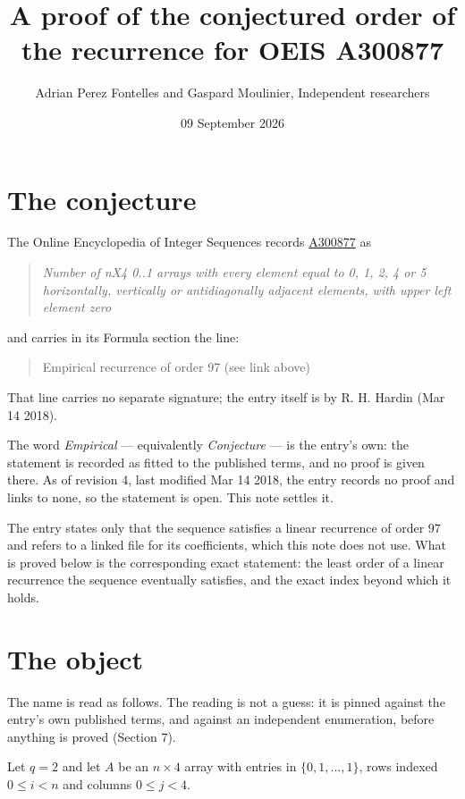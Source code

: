 \documentclass[11pt]{article}
\title{A proof of the conjectured order of the recurrence for OEIS A300877}
\author{Adrian Perez Fontelles and Gaspard Moulinier, Independent researchers}
\date{09 September 2026}
\theoremstyle{definition}
\begin{document}
\maketitle
\section{The conjecture}

The Online Encyclopedia of Integer Sequences records \href{https://oeis.org/A300877}{A300877} as

\begin{quote}\itshape Number of nX4 0..1 arrays with every element equal to 0, 1, 2, 4 or 5 horizontally, vertically or antidiagonally adjacent elements, with upper left element zero\end{quote}

and carries in its Formula section the line:

\begin{quote}\ttfamily Empirical recurrence of order 97 (see link above)\end{quote}

That line carries no separate signature; the entry itself is by R. H. Hardin (Mar 14 2018).

The word {\itshape Empirical} --- equivalently {\itshape Conjecture} --- is the entry's own: the statement is recorded as fitted to the published terms, and no proof is given there. As of revision 4, last modified Mar 14 2018, the entry records no proof and links to none, so the statement is open. This note settles it.

The entry states only that the sequence satisfies a linear recurrence of order $97$ and refers to a linked file for its coefficients, which this note does not use. What is proved below is the corresponding exact statement: the least order of a linear recurrence the sequence eventually satisfies, and the exact index beyond which it holds.

\section{The object}

The name is read as follows. The reading is not a guess: it is pinned against the entry's own published terms, and against an independent enumeration, before anything is proved (Section 7).

Let $q = 2$ and let $A$ be an $n \times 4$ array with entries in $\{0,1,\dots,1\}$, rows indexed $0 \le i < n$ and columns $0 \le j < 4$.
\end{document}
